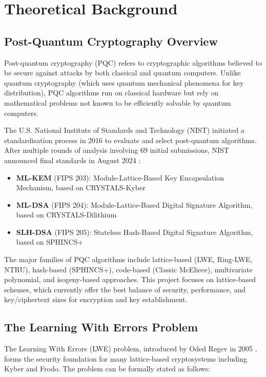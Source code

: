\documentclass[11pt,a4paper]{article}
\begin{document}
\section{Theoretical Background}

\subsection{Post-Quantum Cryptography Overview}

Post-quantum cryptography (PQC) refers to cryptographic algorithms believed to be secure against attacks by both classical and quantum computers. Unlike quantum cryptography (which uses quantum mechanical phenomena for key distribution), PQC algorithms run on classical hardware but rely on mathematical problems not known to be efficiently solvable by quantum computers.

The U.S. National Institute of Standards and Technology (NIST) initiated a standardisation process in 2016 to evaluate and select post-quantum algorithms. After multiple rounds of analysis involving 69 initial submissions, NIST announced final standards in August 2024 \cite{nist2024}:

\begin{itemize}
    \item \textbf{ML-KEM} (FIPS 203): Module-Lattice-Based Key Encapsulation Mechanism, based on CRYSTALS-Kyber
    \item \textbf{ML-DSA} (FIPS 204): Module-Lattice-Based Digital Signature Algorithm, based on CRYSTALS-Dilithium  
    \item \textbf{SLH-DSA} (FIPS 205): Stateless Hash-Based Digital Signature Algorithm, based on SPHINCS+
\end{itemize}

The major families of PQC algorithms include lattice-based (LWE, Ring-LWE, NTRU), hash-based (SPHINCS+), code-based (Classic McEliece), multivariate polynomial, and isogeny-based approaches. This project focuses on lattice-based schemes, which currently offer the best balance of security, performance, and key/ciphertext sizes for encryption and key establishment.

\subsection{The Learning With Errors Problem}

The Learning With Errors (LWE) problem, introduced by Oded Regev in 2005 \cite{regev2005}, forms the security foundation for many lattice-based cryptosystems including Kyber and Frodo. The problem can be formally stated as follows:
\end{document}
